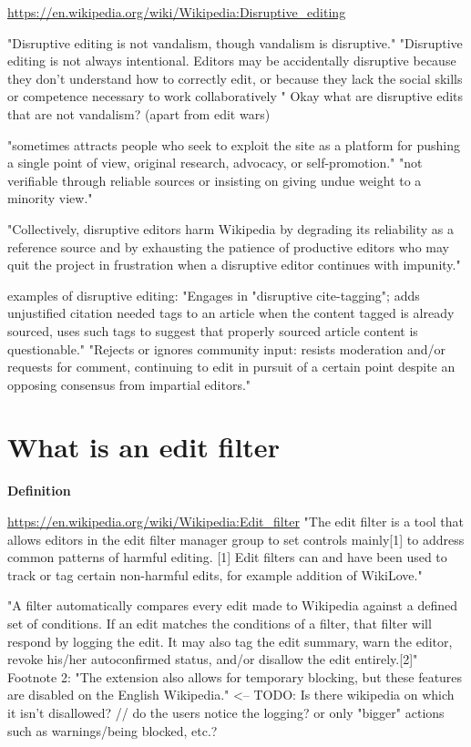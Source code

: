 \documentclass{sigchi}
\begin{document}
\url{https://en.wikipedia.org/wiki/Wikipedia:Disruptive_editing}

"Disruptive editing is not vandalism, though vandalism is disruptive."
"Disruptive editing is not always intentional. Editors may be accidentally disruptive because they don't understand how to correctly edit, or because they lack the social skills or competence necessary to work collaboratively "
Okay what are disruptive edits that are not vandalism? (apart from edit wars)

"sometimes attracts people who seek to exploit the site as a platform for pushing a single point of view, original research, advocacy, or self-promotion."
"not verifiable through reliable sources or insisting on giving undue weight to a minority view."

"Collectively, disruptive editors harm Wikipedia by degrading its reliability as a reference source and by exhausting the patience of productive editors who may quit the project in frustration when a disruptive editor continues with impunity."

examples of disruptive editing:
"Engages in "disruptive cite-tagging"; adds unjustified {{citation needed}} tags to an article when the content tagged is already sourced, uses such tags to suggest that properly sourced article content is questionable."
"Rejects or ignores community input: resists moderation and/or requests for comment, continuing to edit in pursuit of a certain point despite an opposing consensus from impartial editors."

\section{What is an edit filter}

\textbf{Definition}

\url{https://en.wikipedia.org/wiki/Wikipedia:Edit_filter}
"The edit filter is a tool that allows editors in the edit filter manager group to set controls mainly[1] to address common patterns of harmful editing.
[1] Edit filters can and have been used to track or tag certain non-harmful edits, for example addition of WikiLove."

"A filter automatically compares every edit made to Wikipedia against a defined set of conditions. If an edit matches the conditions of a filter, that filter will respond by logging the edit. It may also tag the edit summary, warn the editor, revoke his/her autoconfirmed status, and/or disallow the edit entirely.[2]"
Footnote 2: "The extension also allows for temporary blocking, but these features are disabled on the English Wikipedia." <-- TODO: Is there wikipedia on which it isn't disallowed?
// do the users notice the logging? or only "bigger" actions such as warnings/being blocked, etc.?
\end{document}
